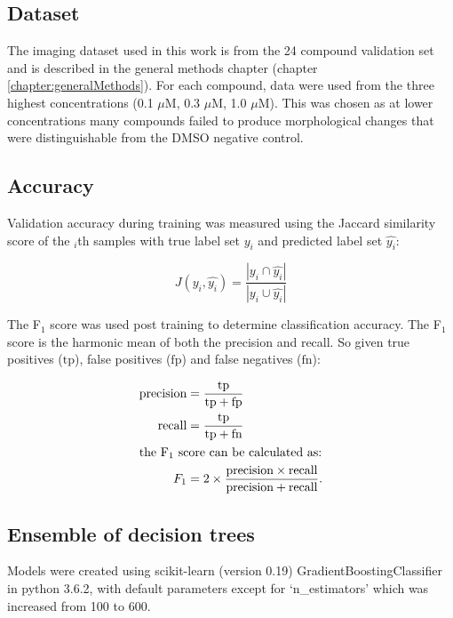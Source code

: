 \documentclass[a4paper,11pt,twoside,openright]{scrbook}
\begin{document}
\subsection{Dataset}

The imaging dataset used in this work is from the 24 compound validation set and is described in the general methods 
chapter (chapter \ref{chapter:generalMethods}).
For each compound, data were used from the three highest concentrations (0.1 $\mu$M, 0.3 $\mu$M, 1.0 $\mu$M).
This was chosen as at lower concentrations many compounds failed to produce morphological changes that were 
distinguishable from the DMSO negative control.


\subsection{Accuracy}

Validation accuracy during training was measured using the Jaccard similarity score of the $_i$th samples with true 
label set $y_i$ and predicted label set $\hat{y_i}$:

\begin{equation}
    J(y_i, \hat{y_i}) = \frac{|y_i \cap \hat{y_i}|}{|y_i \cup \hat{y_i}|}
\end{equation}

The F$_1$ score was used post training to determine classification accuracy.
The F$_1$ score is the harmonic mean of both the precision and recall.
So given true positives ($\text{tp}$), false positives ($\text{fp}$) and false negatives ($\text{fn}$):

\begin{align}
        \text{precision} &= \frac{ \text{tp} }{ \text{tp} + \text{fp} } \\
        \text{recall} &= \frac{\text{tp}}{\text{tp} + \text{fn}} \\
        \intertext{the F$_1$ score can be calculated as:}
        F_1 &= 2 \times \frac{\text{precision} \times \text{recall}}{\text{precision} + \text{recall}}.
\end{align}

\subsection{Ensemble of decision trees}

Models were created using scikit-learn (version 0.19) GradientBoostingClassifier in python 3.6.2, with default 
parameters except for `n\_estimators' which was increased from 100 to 600.
\end{document}
